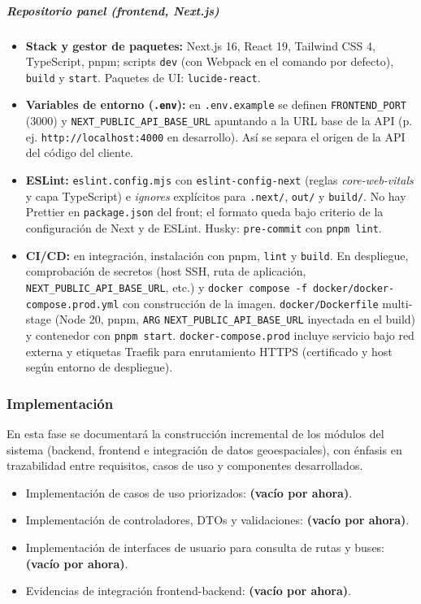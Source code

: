 \subparagraph{Repositorio panel (frontend, Next.js)}
\begin{itemize}
    \item \textbf{Stack y gestor de paquetes:} Next.js 16, React 19, Tailwind CSS 4, TypeScript, pnpm; scripts \texttt{dev} (con Webpack en el comando por defecto), \texttt{build} y \texttt{start}. Paquetes de UI: \texttt{lucide-react}.
    \item \textbf{Variables de entorno (\texttt{.env}):} en \texttt{.env.example} se definen \texttt{FRONTEND\_PORT} (3000) y \texttt{NEXT\_PUBLIC\_API\_BASE\_URL} apuntando a la URL base de la API (p.\,ej. \texttt{http://localhost:4000} en desarrollo). Así se separa el origen de la API del código del cliente.
    \item \textbf{ESLint:} \texttt{eslint.config.mjs} con \texttt{eslint-config-next} (reglas \textit{core-web-vitals} y capa TypeScript) e \textit{ignores} explícitos para \texttt{.next/}, \texttt{out/} y \texttt{build/}. No hay Prettier en \texttt{package.json} del front; el formato queda bajo criterio de la configuración de Next y de ESLint. Husky: \texttt{pre-commit} con \texttt{pnpm lint}.
    \item \textbf{CI/CD:} en integración, instalación con pnpm, \texttt{lint} y \texttt{build}. En despliegue, comprobación de secretos (host SSH, ruta de aplicación, \texttt{NEXT\_PUBLIC\_API\_BASE\_URL}, etc.) y \texttt{docker compose -f docker/docker-compose.prod.yml} con construcción de la imagen. \texttt{docker/Dockerfile} multi-stage (Node 20, pnpm, \texttt{ARG} \texttt{NEXT\_PUBLIC\_API\_BASE\_URL} inyectada en el build) y contenedor con \texttt{pnpm start}. \texttt{docker-compose.prod} incluye servicio bajo red externa y etiquetas Traefik para enrutamiento HTTPS (certificado y host según entorno de despliegue).
\end{itemize}

\subsubsection{Implementación}

En esta fase se documentará la construcción incremental de los módulos del sistema (backend, frontend e integración de datos geoespaciales), con énfasis en trazabilidad entre requisitos, casos de uso y componentes desarrollados.

\begin{itemize}
    \item Implementación de casos de uso priorizados: \textbf{(vacío por ahora)}.
    \item Implementación de controladores, DTOs y validaciones: \textbf{(vacío por ahora)}.
    \item Implementación de interfaces de usuario para consulta de rutas y buses: \textbf{(vacío por ahora)}.
    \item Evidencias de integración frontend-backend: \textbf{(vacío por ahora)}.
\end{itemize}

